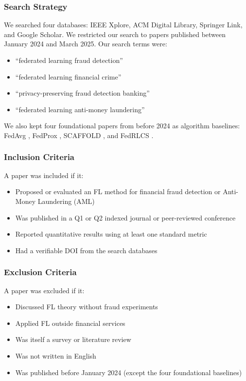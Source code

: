 \documentclass[12pt, a4paper]{article}
\begin{document}
\subsubsection{Search Strategy}

We searched four databases: IEEE Xplore, ACM Digital Library, Springer Link, and Google Scholar. We restricted our search to papers published between January 2024 and March 2025. Our search terms were:
\begin{itemize}[noitemsep]
\item ``federated learning fraud detection''
\item ``federated learning financial crime''
\item ``privacy-preserving fraud detection banking''
\item ``federated learning anti-money laundering''
\end{itemize}

We also kept four foundational papers from before 2024 as algorithm baselines: FedAvg \citep{mcmahan2017}, FedProx \citep{li2020fedprox}, SCAFFOLD \citep{karimireddy2020}, and FedRLCS \citep{wang2023fedrlcs}.

\subsubsection{Inclusion Criteria}

A paper was included if it:
\begin{itemize}[noitemsep]
\item Proposed or evaluated an FL method for financial fraud detection or Anti-Money Laundering (AML)
\item Was published in a Q1 or Q2 indexed journal or peer-reviewed conference
\item Reported quantitative results using at least one standard metric
\item Had a verifiable DOI from the search databases
\end{itemize}

\subsubsection{Exclusion Criteria}

A paper was excluded if it:
\begin{itemize}[noitemsep]
\item Discussed FL theory without fraud experiments
\item Applied FL outside financial services
\item Was itself a survey or literature review
\item Was not written in English
\item Was published before January 2024 (except the four foundational baselines)
\end{itemize}
\end{document}
